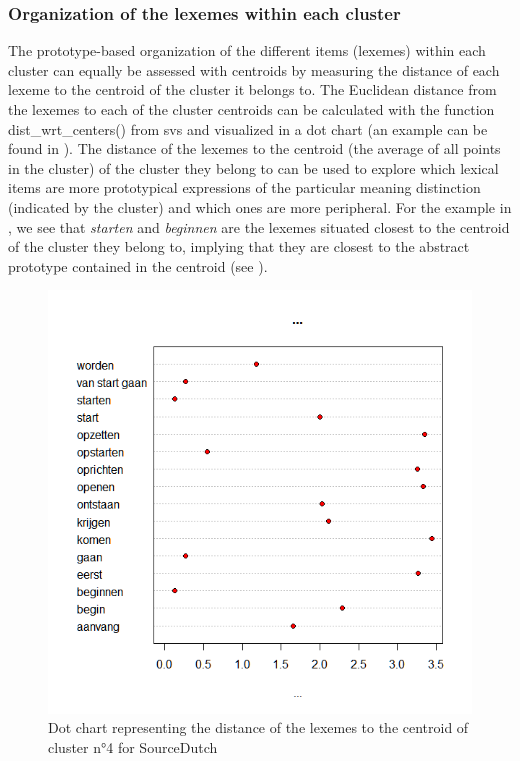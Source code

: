 \subsubsection{Organization of the lexemes within each cluster}
\label{sec:3.8.1.2}
The prototype-based organization of the different items (lexemes) within each cluster can equally be assessed with centroids by measuring the distance of each lexeme to the centroid of the cluster it belongs to. The Euclidean distance from the lexemes to each of the cluster centroids can be calculated with the function dist\_wrt\_centers() from svs and visualized in a dot chart (an example can be found in ). The distance of the lexemes to the centroid (the average of all points in the cluster) of the cluster they belong to can be used to explore which lexical items are more prototypical expressions of the particular meaning distinction (indicated by the cluster) and which ones are more peripheral. For the example in , we see that \textit{starten} and \textit{beginnen} are the lexemes situated closest to the centroid of the cluster they belong to, implying that they are closest to the abstract prototype contained in the centroid (see ).

\begin{figure}
\includegraphics[height=.4\textheight]{figures/Vandevoorde2-img49.png}
\caption{\label{fig:3:49}  Dot chart representing the distance of the lexemes to the centroid of cluster n°4 for SourceDutch}
\end{figure}


